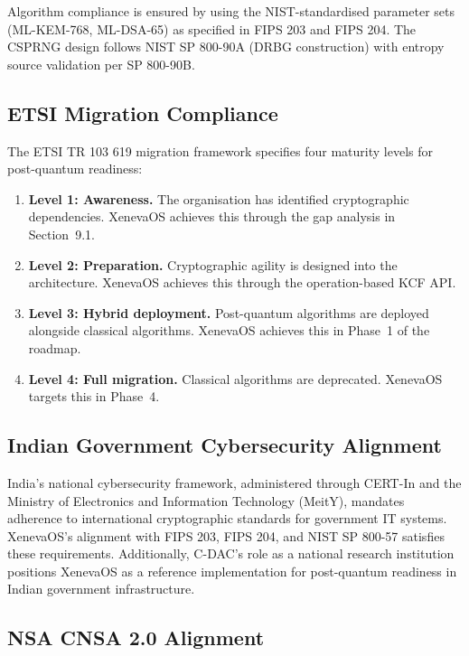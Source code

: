 \documentclass[11pt, a4paper]{article}
\begin{document}
Algorithm compliance is ensured by using the NIST-standardised parameter sets (ML-KEM-768, ML-DSA-65) as specified in FIPS 203 and FIPS 204. The CSPRNG design follows NIST SP 800-90A (DRBG construction) with entropy source validation per SP 800-90B.

\subsection{ETSI Migration Compliance}\label{sec:etsi-compliance}

The ETSI TR 103 619 migration framework specifies four maturity levels for post-quantum readiness:

\begin{enumerate}
    \item \textbf{Level 1: Awareness.} The organisation has identified cryptographic dependencies. XenevaOS achieves this through the gap analysis in Section~9.1.
    \item \textbf{Level 2: Preparation.} Cryptographic agility is designed into the architecture. XenevaOS achieves this through the operation-based KCF API.
    \item \textbf{Level 3: Hybrid deployment.} Post-quantum algorithms are deployed alongside classical algorithms. XenevaOS achieves this in Phase~1 of the roadmap.
    \item \textbf{Level 4: Full migration.} Classical algorithms are deprecated. XenevaOS targets this in Phase~4.
\end{enumerate}

\subsection{Indian Government Cybersecurity Alignment}\label{sec:india-compliance}

India's national cybersecurity framework, administered through CERT-In and the Ministry of Electronics and Information Technology (MeitY), mandates adherence to international cryptographic standards for government IT systems. XenevaOS's alignment with FIPS 203, FIPS 204, and NIST SP 800-57 satisfies these requirements. Additionally, C-DAC's role as a national research institution positions XenevaOS as a reference implementation for post-quantum readiness in Indian government infrastructure.

\subsection{NSA CNSA 2.0 Alignment}\label{sec:cnsa2-compliance}
\end{document}
